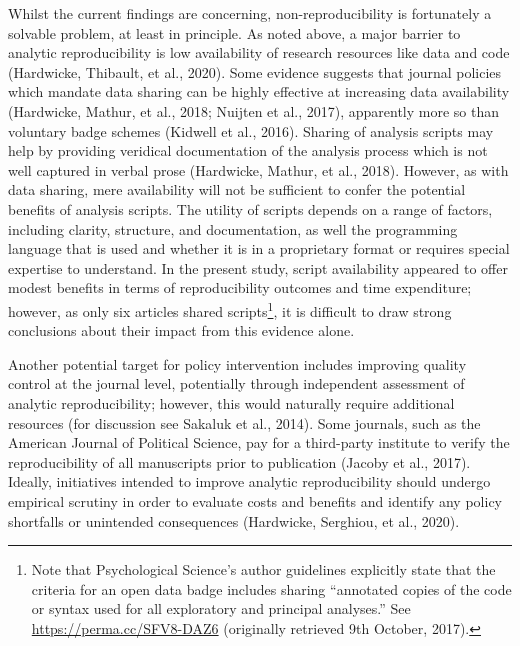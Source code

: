 \documentclass[english,,man,floatsintext]{apa6}
\begin{document}
Whilst the current findings are concerning, non-reproducibility is fortunately a solvable problem, at least in principle. As noted above, a major barrier to analytic reproducibility is low availability of research resources like data and code (Hardwicke, Thibault, et al., 2020). Some evidence suggests that journal policies which mandate data sharing can be highly effective at increasing data availability (Hardwicke, Mathur, et al., 2018; Nuijten et al., 2017), apparently more so than voluntary badge schemes (Kidwell et al., 2016). Sharing of analysis scripts may help by providing veridical documentation of the analysis process which is not well captured in verbal prose (Hardwicke, Mathur, et al., 2018). However, as with data sharing, mere availability will not be sufficient to confer the potential benefits of analysis scripts. The utility of scripts depends on a range of factors, including clarity, structure, and documentation, as well the programming language that is used and whether it is in a proprietary format or requires special expertise to understand. In the present study, script availability appeared to offer modest benefits in terms of reproducibility outcomes and time expenditure; however, as only six articles shared scripts\footnote{Note that Psychological Science's author guidelines explicitly state that the criteria for an open data badge includes sharing \enquote{annotated copies of the code or syntax used for all exploratory and principal analyses.} See \url{https://perma.cc/SFV8-DAZ6} (originally retrieved 9th October, 2017).}, it is difficult to draw strong conclusions about their impact from this evidence alone.

Another potential target for policy intervention includes improving quality control at the journal level, potentially through independent assessment of analytic reproducibility; however, this would naturally require additional resources (for discussion see Sakaluk et al., 2014). Some journals, such as the American Journal of Political Science, pay for a third-party institute to verify the reproducibility of all manuscripts prior to publication (Jacoby et al., 2017). Ideally, initiatives intended to improve analytic reproducibility should undergo empirical scrutiny in order to evaluate costs and benefits and identify any policy shortfalls or unintended consequences (Hardwicke, Serghiou, et al., 2020).
\end{document}
